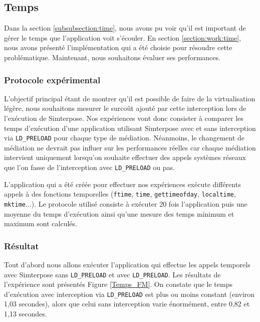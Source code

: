 \subsection{Temps}
\label{section:temps}

Dans la section \ref{subsubsection:time}, nous avons pu voir qu'il est important de gérer le temps que l'application voit s'écouler. En section \ref{section:work:time}, nous avons présenté l'implémentation qui a été choisie pour résoudre cette problématique. Maintenant, nous souhaitons évaluer ses performances.

\subsubsection{Protocole expérimental}
L'objectif principal étant de montrer qu'il est possible de faire de la virtualisation légère, nous souhaitons mesurer le surcoût ajouté par cette interception lors de l'exécution de Simterpose. Nos expériences vont donc consister à comparer les temps d'exécution d'une application utilisant Simterpose avec et sans interception via \texttt{LD\_PRELOAD} pour chaque type de médiation. Néanmoins, le changement de médiation ne devrait pas influer sur les performances réelles car chaque médiation intervient uniquement lorsqu'on souhaite effectuer des appels systèmes réseaux que l'on fasse de l'interception avec \texttt{LD\_PRELOAD} ou pas.

L'application qui a été créée pour effectuer nos expériences exécute différents appels à des fonctions temporelles (\texttt{ftime}, \texttt{time}, \texttt{gettimeofday}, \texttt{localtime}, \texttt{mktime}...). Le protocole utilisé consiste à exécuter 20 fois l'application puis une moyenne du temps d'exécution ainsi qu'une mesure des temps minimum et maximum sont calculés.

\subsubsection{Résultat}
 Tout d'abord nous allons exécuter l'application qui effectue les appels temporels avec Simterpose sans \texttt{LD\_PRELOAD} et avec \texttt{LD\_PRELOAD}. Les résultats de l'expérience sont présentés Figure \ref{Temps_FM}. On constate que le temps d'exécution avec interception via \texttt{LD\_PRELOAD} est plus ou moins constant (environ 1,03 secondes), alors que celui sans interception varie énormément, entre 0,82 et 1,13 secondes. 

